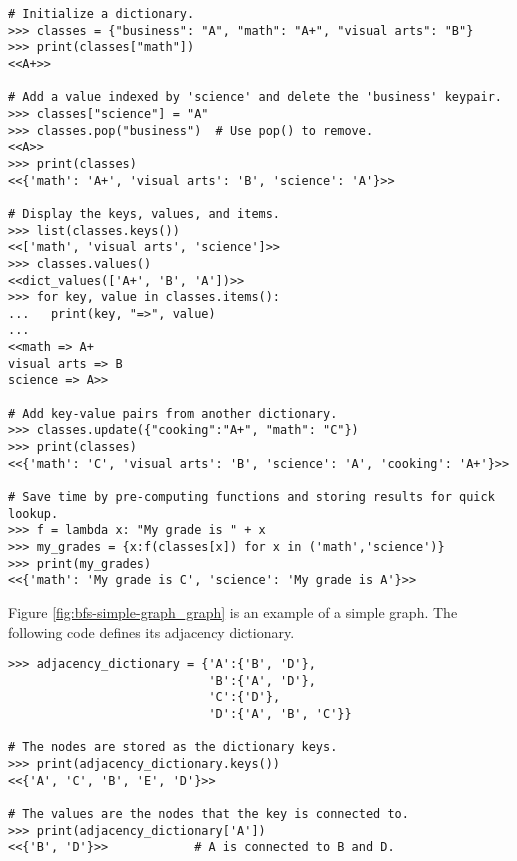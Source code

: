 \begin{lstlisting}
# Initialize a dictionary.
>>> classes = {"business": "A", "math": "A+", "visual arts": "B"}
>>> print(classes["math"])
<<A+>>

# Add a value indexed by 'science' and delete the 'business' keypair.
>>> classes["science"] = "A"
>>> classes.pop("business")  # Use pop() to remove.
<<A>>
>>> print(classes)
<<{'math': 'A+', 'visual arts': 'B', 'science': 'A'}>>

# Display the keys, values, and items.
>>> list(classes.keys())
<<['math', 'visual arts', 'science']>>
>>> classes.values()
<<dict_values(['A+', 'B', 'A'])>>
>>> for key, value in classes.items():
...   print(key, "=>", value)
...
<<math => A+
visual arts => B
science => A>>

# Add key-value pairs from another dictionary.
>>> classes.update({"cooking":"A+", "math": "C"})
>>> print(classes)
<<{'math': 'C', 'visual arts': 'B', 'science': 'A', 'cooking': 'A+'}>>

# Save time by pre-computing functions and storing results for quick lookup.
>>> f = lambda x: "My grade is " + x
>>> my_grades = {x:f(classes[x]) for x in ('math','science')}
>>> print(my_grades)
<<{'math': 'My grade is C', 'science': 'My grade is A'}>>
\end{lstlisting}

Figure \ref{fig:bfs-simple-graph_graph} is an example of a simple graph. The following code defines its adjacency dictionary.

\begin{lstlisting}
>>> adjacency_dictionary = {'A':{'B', 'D'},
                            'B':{'A', 'D'},
                            'C':{'D'},
                            'D':{'A', 'B', 'C'}}

# The nodes are stored as the dictionary keys.
>>> print(adjacency_dictionary.keys())
<<{'A', 'C', 'B', 'E', 'D'}>>

# The values are the nodes that the key is connected to.
>>> print(adjacency_dictionary['A'])
<<{'B', 'D'}>>            # A is connected to B and D.
\end{lstlisting}

